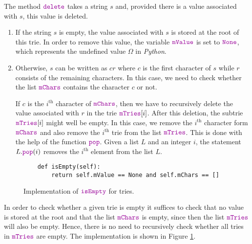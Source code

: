 The method $\mytt{delete}$ takes a string $s$ and, provided there is a value associated with $s$, this
value is deleted.
\begin{enumerate}
\item If the string $s$ is empty, the value associated with $s$ is stored at the root of this trie.
      In order to remove this value, the variable $\mytt{mValue}$ is set to $\mytt{None}$, which represents
      the undefined value $\Omega$ in \textsl{Python}.
\item Otherwise, $s$ can be written as $cr$ where $c$ is the first character of $s$ while $r$
      consists of the remaining characters.  In this case, we need to check whether the list
      $\mytt{mChars}$ contains the character $c$ or not.
 
      If $c$ is the $i^\textrm{th}$ character of $\mytt{mChars}$, then we have to recursively
      delete the value associated with $r$ in the trie $\mytt{mTries}[i]$.  
      After this deletion, the subtrie  $\mytt{mTries}[i]$ might well be empty.  In this case,
      we remove the $i^\textrm{th}$ character form $\mytt{mChars}$ and also remove the $i^\textrm{th}$ trie from the list
      $\mytt{mTries}$.  This is done with the help of the function $\mytt{pop}$.
      Given a list $L$ and an integer $i$, the statement $L.\mytt{pop}(i)$ removes the $i^\textrm{th}$ element from
      the list $L$.
\end{enumerate}

\begin{figure}[!ht]
\centering
\begin{verbatim}
    def isEmpty(self):
        return self.mValue == None and self.mChars == []
\end{verbatim}
\vspace*{-0.3cm}
\caption{Implementation of $\mytt{isEmpty}$ for tries.}
\label{fig:trie.ipython-isEmpty}
\end{figure}

In order to check whether a given trie is empty it suffices to check that no value is stored at the root
and that the list $\mytt{mChars}$ is empty, since then the list $\mytt{mTries}$ will also be empty.  Hence,
there is no need to recursively check whether all tries in $\mytt{mTries}$ are empty.  
The implementation is shown in Figure \ref{fig:trie.ipython-isEmpty}.
\pagebreak

